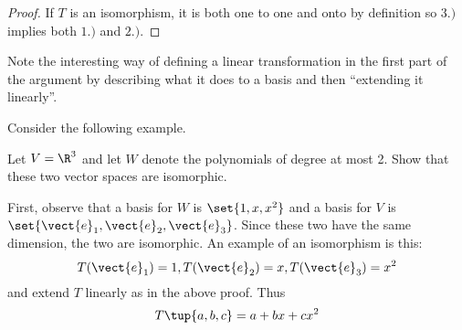 \begin{proof}
If $T$ is an isomorphism, it is both one to one and onto by definition so $
3.)$ implies both $1.)$ and $2.)$.
\end{proof}

Note the interesting way of defining a linear transformation in the first
part of the argument by describing what it does to a basis and then
``extending it linearly''.

Consider the following example. 

\begin{example}{}{}
Let $V=\R^{3}$ and let $W$ denote the polynomials of degree at most
2. Show that these two vector spaces are isomorphic.
\end{example}

\begin{solution}
First, observe that a basis for $W$ is $\set{1,x,x^{2}} $ and a basis for $V$
is $\set{\vect{e}_{1},\vect{e}_{2},\vect{e}_{3}}$. Since these two
have the same dimension, the two are
isomorphic. An example of an isomorphism is this:\ 
\begin{equation*}
T(\vect{e}_{1})=1,T(\vect{e}_{2})=x,T(\vect{e}_{3})=x^{2}
\end{equation*}
and extend $T$ linearly as in the above proof. Thus 
\begin{equation*}
T\tup{a,b,c} =a+bx+cx^{2}
\end{equation*}
\end{solution}
